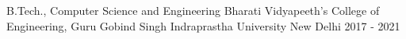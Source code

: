 \smallskip


\begin{cventries}

  \cventry
    {B.Tech., Computer Science and Engineering} %
    {Bharati Vidyapeeth’s College of Engineering, Guru Gobind Singh Indraprastha University} %
    {New Delhi} %
    {2017 - 2021} %
    {}
    
\vspace{-0.3cm}    
\end{cventries}
